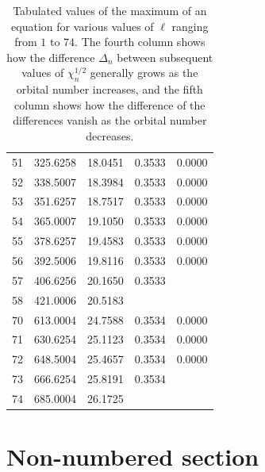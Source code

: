 \documentclass[12pt]{article}
\begin{document}
\begin{table}[h]
\begin{tabular}{ c | c c c c}
	51& 325.6258 & 18.0451 & 0.3533 & 0.0000 \\
	52& 338.5007 & 18.3984 & 0.3533 & 0.0000 \\  
	53& 351.6257 & 18.7517 & 0.3533 & 0.0000 \\
	54& 365.0007 & 19.1050 & 0.3533 & 0.0000 \\  
	55& 378.6257 & 19.4583 & 0.3533 & 0.0000 \\
	56& 392.5006 & 19.8116 & 0.3533 & 0.0000 \\  
	57& 406.6256 & 20.1650 & 0.3533 &\\
	58& 421.0006 & 20.5183 &  & \\\hline 
	70& 613.0004 & 24.7588 & 0.3534 & 0.0000 \\  
	71& 630.6254 & 25.1123 & 0.3534 & 0.0000 \\
	72& 648.5004 & 25.4657 & 0.3534 & 0.0000 \\  
	73& 666.6254 & 25.8191 & 0.3534 & \\
	74& 685.0004 & 26.1725 &  &\\
\end{tabular}
\caption{Tabulated values of the maximum of an equation for various values of $\ell$ ranging from \(1\) to \(74\). The fourth column shows how the difference $\Delta_n$ between subsequent values of $\chi_n^{1/2}$ generally grows as the orbital number increases, and the fifth column shows how the difference of the differences vanish as the orbital number decreases.}\label{table:parax:roots2}
\end{table}


\section*{Non-numbered section}
\end{document}
